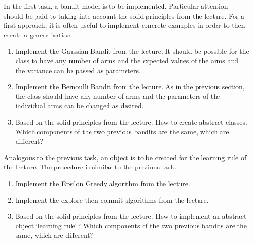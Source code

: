 \documentclass[a4paper,12pt]{report}
\begin{document}


In the first task, a bandit model is to be implemented. Particular attention should be paid to taking into account the solid principles from the lecture. For a first approach, it is often useful to implement concrete examples in order to then create a generalisation.  
\begin{enumerate}
	\item Implement the Gaussian Bandit from the lecture. It should be possible for the class to have any number of arms and the expected values of the arms and the variance can be passed as parameters.
	\item Implement the Bernoulli Bandit from the lecture. As in the previous section, the class should have any number of arms and the parameters of the individual arms can be changed as desired.
	\item Based on the solid principles from the lecture. How to create abstract classes. Which components of the two previous bandits are the same, which are different?
\end{enumerate}

Analogous to the previous task, an object is to be created for the learning rule of the lecture. 
The procedure is similar to the previous task. 
\begin{enumerate}
	\item Implement the Epsilon Greedy algorithm from the lecture. 
	\item Implement the explore then commit algorithms from the lecture. 
	\item Based on the solid principles from the lecture. How to implement an abstract object `learning rule`? Which components of the two previous bandits are the same, which are different?
\end{enumerate}
\end{document}
